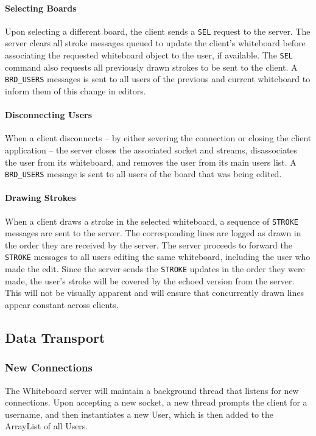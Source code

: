 \paragraph{Selecting Boards} Upon selecting a different board, the client sends a \texttt{SEL} request to the server. The server clears all stroke messages queued to update the client's whiteboard before associating the requested whiteboard object to the user, if available. The \texttt{SEL} command also requests all previously drawn strokes to be sent to the client. A \texttt{BRD\_USERS} messages is sent to all users of the previous and current whiteboard to inform them of this change in editors.

\paragraph{Disconnecting Users}
When a client disconnects -- by either severing the connection or closing the client application -- the server closes the associated socket and streams, disassociates the user from its whiteboard, and removes the user from its main users list. A \texttt{BRD\_USERS} message is sent to all users of the board that was being edited.

\paragraph{Drawing Strokes} When a client draws a stroke in the selected whiteboard, a sequence of \texttt{STROKE} messages are sent to the server. The corresponding lines are logged as drawn in the order they are received by the server. The server proceeds to forward the \texttt{STROKE} messages to all users editing the same whiteboard, including the user who made the edit. Since the server sends the \texttt{STROKE} updates in the order they were made, the user's stroke will be covered by the echoed version from the server. This will not be visually apparent and will ensure that concurrently drawn lines appear constant across clients.

\subsection{Data Transport}

\subsubsection{New Connections}

The Whiteboard server will maintain a background thread that listens for new connections. Upon accepting a new socket, a new thread prompts the client for a username, and then instantiates a new User, which is then added to the ArrayList of all Users.

